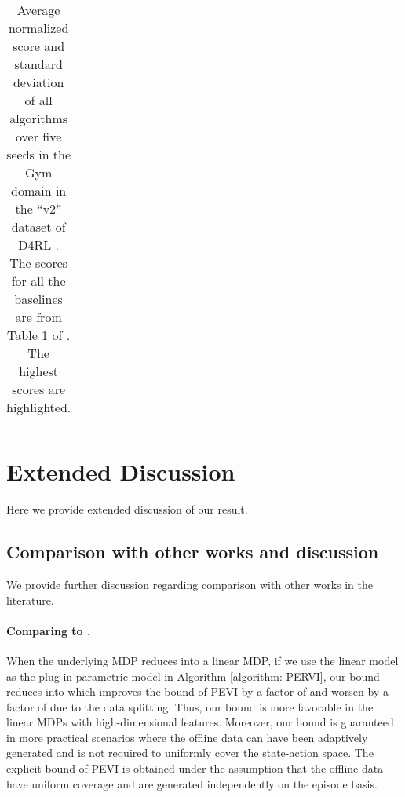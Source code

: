 \documentclass{article} \usepackage{iclr2023/iclr2023_conference,times}
\begin{document}
\begin{table}[]
{\begin{tabular}{lllllllll}
    \end{tabular}
    }
    \caption{{Average normalized score and standard deviation of all algorithms over five seeds in the Gym domain in the ``v2'' dataset of D4RL \citep{DBLP:journals/corr/abs-2004-07219}. The scores for all the baselines are from Table 1 of \cite{bai2022pessimistic}. The highest scores are highlighted.}}
    \label{tab: d4rl result}
\end{table}
\color{black} \section{Extended Discussion}
\label{section: extended discussion}
Here we provide extended discussion of our result. 
\subsection{Comparison with other works and discussion}
\label{subsection: comparison with other works in details}

We provide further discussion regarding comparison with other works in the literature.  
\paragraph{Comparing to \cite{jin2021pessimism}.}
When the underlying MDP reduces into a linear MDP, if we use the linear model as the plug-in parametric model in Algorithm \ref{algorithm: PERVI},  our bound reduces into  which improves the bound  of PEVI \citep[Corollary~4.6]{jin2021pessimism} by a factor of  and worsen by a factor of  due to the data splitting. Thus, our bound is more favorable in the linear MDPs with high-dimensional features. Moreover, our bound is guaranteed in more practical scenarios where the offline data can have been adaptively generated and is not required to uniformly cover the state-action space. The explicit bound  of PEVI \citep[Corollary~4.6]{jin2021pessimism} is obtained under the assumption that the offline data have uniform coverage and are generated independently on the episode basis. 
\end{document}
